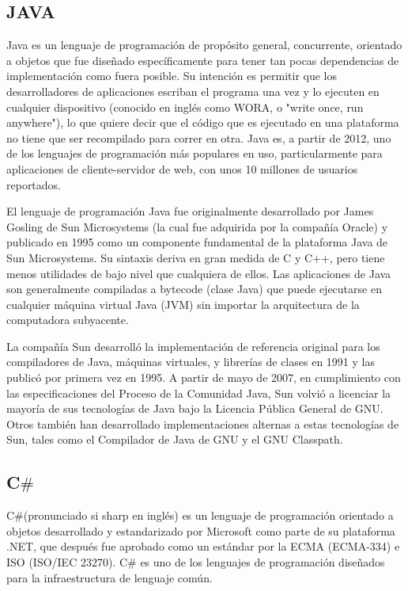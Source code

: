 \documentclass[twoside,twocolumn]{article}
\begin{document}
\subsection{JAVA}

Java es un lenguaje de programación de propósito general, concurrente, orientado a objetos que fue diseñado específicamente para tener tan pocas dependencias de implementación como fuera posible. Su intención es permitir que los desarrolladores de aplicaciones escriban el programa una vez y lo ejecuten en cualquier dispositivo (conocido en inglés como WORA, o "write once, run anywhere"), lo que quiere decir que el código que es ejecutado en una plataforma no tiene que ser recompilado para correr en otra. Java es, a partir de 2012, uno de los lenguajes de programación más populares en uso, particularmente para aplicaciones de cliente-servidor de web, con unos 10 millones de usuarios reportados.

El lenguaje de programación Java fue originalmente desarrollado por James Gosling de Sun Microsystems (la cual fue adquirida por la compañía Oracle) y publicado en 1995 como un componente fundamental de la plataforma Java de Sun Microsystems. Su sintaxis deriva en gran medida de C y C++, pero tiene menos utilidades de bajo nivel que cualquiera de ellos. Las aplicaciones de Java son generalmente compiladas a bytecode (clase Java) que puede ejecutarse en cualquier máquina virtual Java (JVM) sin importar la arquitectura de la computadora subyacente.

La compañía Sun desarrolló la implementación de referencia original para los compiladores de Java, máquinas virtuales, y librerías de clases en 1991 y las publicó por primera vez en 1995. A partir de mayo de 2007, en cumplimiento con las especificaciones del Proceso de la Comunidad Java, Sun volvió a licenciar la mayoría de sus tecnologías de Java bajo la Licencia Pública General de GNU. Otros también han desarrollado implementaciones alternas a estas tecnologías de Sun, tales como el Compilador de Java de GNU y el GNU Classpath.

\subsection{C$\#$}

C$\#$(pronunciado si sharp en inglés) es un lenguaje de programación orientado a objetos desarrollado y estandarizado por Microsoft como parte de su plataforma .NET, que después fue aprobado como un estándar por la ECMA (ECMA-334) e ISO (ISO/IEC 23270). C$\#$ es uno de los lenguajes de programación diseñados para la infraestructura de lenguaje común.
\end{document}

